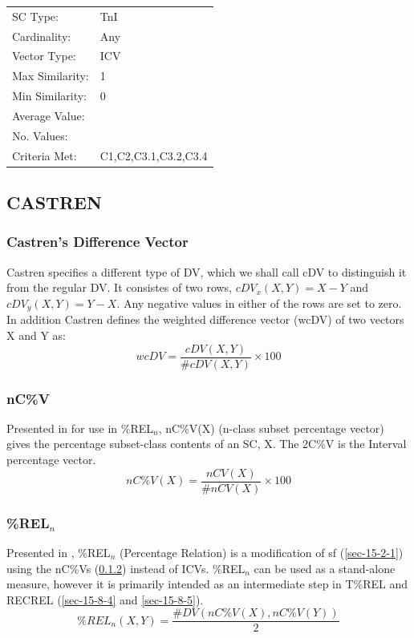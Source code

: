 \documentclass{article}
\begin{document}
\begin{center}
\begin{tabular}{ll}
 SC Type:         &  TnI                   \\
 Cardinality:     &  Any                   \\
 Vector Type:     &  ICV                   \\
 Max Similarity:  &  1                     \\
 Min Similarity:  &  0                     \\
 Average Value:   &                        \\
 No. Values:      &                        \\
 Criteria Met:    &  C1,C2,C3.1,C3.2,C3.4  \\
\end{tabular}
\end{center}
\subsection{CASTREN}
\label{sec-15-8}
\subsubsection{Castren's Difference Vector}
\label{sec-15-8-1}

Castren specifies a different type of DV, which we shall call cDV to
distinguish it from the regular DV. It consistes of two rows,
$cDV_{x}(X,Y)=X-Y$ and $cDV_{y}(X,Y)=Y-X$. Any negative values in
either of the rows are set to zero.  In addition Castren defines the
weighted difference vector (wcDV) of two vectors X and Y as:
$$wcDV=\frac{cDV(X,Y)}{\#cDV(X,Y)}\times 100$$
\subsubsection{nC\%V}
\label{sec-15-8-2}

Presented in \citet{Castren1994} for use in \%REL$_{n}$, nC\%V(X) (n-class
subset percentage vector) gives the percentage subset-class contents
of an SC, X. The 2C\%V is the Interval percentage vector.
$$nC\%V(X)=\frac{nCV(X)}{\#nCV(X)}\times 100$$
\subsubsection{\%REL$_{n}$}
\label{sec-15-8-3}

Presented in \citet{Castren1994}, \%REL$_{n}$ (Percentage Relation) is a
modification of sf (\ref{sec-15-2-1}) using the nC\%Vs (\ref{sec-15-8-2}) instead of
ICVs. \%REL$_{n}$ can be used as a stand-alone measure, however it is
primarily intended as an intermediate step in T\%REL and RECREL (\ref{sec-15-8-4}
and \ref{sec-15-8-5}). $$\%REL_n(X,Y)=\frac{\#DV(nC\%V(X),nC\%V(Y))}{2}$$
\end{document}
